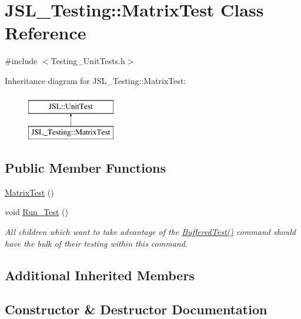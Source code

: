 \hypertarget{classJSL__Testing_1_1MatrixTest}{}\section{J\+S\+L\+\_\+\+Testing\+:\+:Matrix\+Test Class Reference}
\label{classJSL__Testing_1_1MatrixTest}


{\ttfamily \#include $<$Testing\+\_\+\+Unit\+Tests.\+h$>$}

Inheritance diagram for J\+S\+L\+\_\+\+Testing\+:\+:Matrix\+Test\+:\begin{figure}[H]
\begin{center}
\leavevmode
\includegraphics[height=2.000000cm]{classJSL__Testing_1_1MatrixTest}
\end{center}
\end{figure}
\subsection*{Public Member Functions}
\begin{DoxyCompactItemize}
\item 
\hyperlink{classJSL__Testing_1_1MatrixTest_a9cd56fe4c4d7db6cfd53c86252e8d033}{Matrix\+Test} ()
\item 
void \hyperlink{classJSL__Testing_1_1MatrixTest_a8fe2a671faf414dbd13c407ab52b75fb}{Run\+\_\+\+Test} ()
\begin{DoxyCompactList}\small\item\em All children which want to take advantage of the \hyperlink{classJSL_1_1UnitTest_aabec19b081be8a428f12e4b5e3dc2a9c}{Buffered\+Test()} command should have the bulk of their testing within this command. \end{DoxyCompactList}\end{DoxyCompactItemize}
\subsection*{Additional Inherited Members}


\subsection{Constructor \& Destructor Documentation}
\mbox{\label{classJSL__Testing_1_1MatrixTest_a9cd56fe4c4d7db6cfd53c86252e8d033}} 

